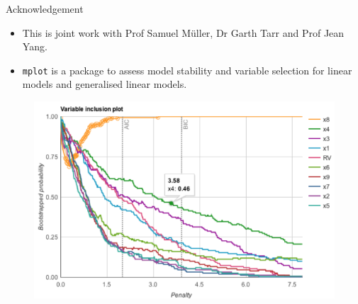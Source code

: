 \documentclass[12pt,aspectratio=169]{beamer}
\begin{document}
\begin{frame}{Acknowledgement}
\begin{itemize}
	\item This is joint work with Prof Samuel M\"{u}ller, Dr Garth Tarr and Prof Jean Yang.
	\item \texttt{mplot} \citet{Tarr2018} is a package to assess model stability and variable selection for linear models and generalised linear models.
\end{itemize}
\begin{figure}
	\centering
	\includegraphics[width=0.55\linewidth]{mplot_ad}
	\label{fig:mplotad}
\end{figure}
\end{frame}
\end{document}

